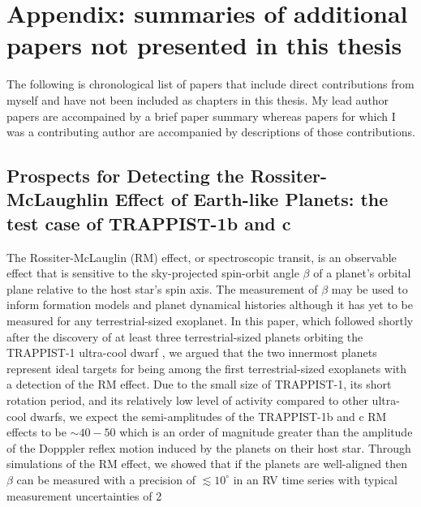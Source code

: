 \chapter[Appendix]{Appendix: summaries of additional papers not presented
  in this thesis}

The following is chronological list of papers
that include direct contributions from myself and have not been included as
chapters in this thesis. My lead author papers are accompained by a brief paper
summary whereas papers for which I was a contributing author are accompanied by
descriptions of those contributions.

\section{Prospects for Detecting the Rossiter-McLaughlin Effect of
  Earth-like Planets: the test case of TRAPPIST-1b and c \citep{cloutier16a}}
The Rossiter-McLauglin (RM) effect, or spectroscopic transit, is an observable
effect that is sensitive to the sky-projected spin-orbit angle $\beta$ of a
planet's orbital plane relative to the host star's spin axis.
The measurement of $\beta$ may
be used to inform formation models and planet dynamical histories although it
has yet to be measured for any terrestrial-sized exoplanet. 
In this paper, which followed shortly after the discovery of at least three
terrestrial-sized planets orbiting the TRAPPIST-1 ultra-cool dwarf
\citep{gillon16}, we
argued that the two innermost planets represent ideal targets for being among
the first terrestrial-sized exoplanets with a detection of the RM effect.
Due to the small size of TRAPPIST-1, its short rotation period, and its
relatively low level of activity compared to other ultra-cool dwarfs, we expect
the semi-amplitudes of the TRAPPIST-1b and c RM effects to be $\sim 40-50$
\mps{} which is an order of magnitude greater than the amplitude of the
Dopppler reflex motion induced by the planets on their host star.
Through simulations of the RM effect, we showed that if the planets are
well-aligned then $\beta$ can be measured with a precision of
$\lesssim 10^{\circ}$ in an RV time series with typical measurement
uncertainties of 2 


